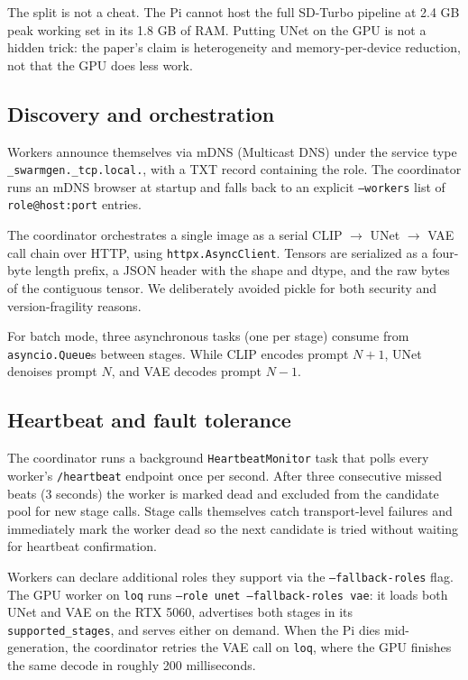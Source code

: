 \documentclass[conference]{IEEEtran}
\begin{document}
The split is not a cheat. The Pi cannot host the full SD-Turbo pipeline at
2.4 GB peak working set in its 1.8 GB of RAM. Putting UNet on the GPU is not
a hidden trick: the paper's claim is heterogeneity and memory-per-device
reduction, not that the GPU does less work.

\subsection{Discovery and orchestration}

Workers announce themselves via mDNS (Multicast DNS) under the service type
\texttt{\_swarmgen.\_tcp.local.}, with a TXT record containing the role.
The coordinator runs an mDNS browser at startup and falls back to an
explicit \texttt{--workers} list of \texttt{role@host:port} entries.

The coordinator orchestrates a single image as a serial CLIP $\rightarrow$
UNet $\rightarrow$ VAE call chain over HTTP, using \texttt{httpx.AsyncClient}.
Tensors are serialized as a four-byte length prefix, a JSON header with the
shape and dtype, and the raw bytes of the contiguous tensor. We deliberately
avoided pickle for both security and version-fragility reasons.

For batch mode, three asynchronous tasks (one per stage) consume from
\texttt{asyncio.Queue}s between stages. While CLIP encodes prompt $N+1$,
UNet denoises prompt $N$, and VAE decodes prompt $N-1$.

\subsection{Heartbeat and fault tolerance}

The coordinator runs a background \texttt{HeartbeatMonitor} task that polls
every worker's \texttt{/heartbeat} endpoint once per second. After three
consecutive missed beats (3 seconds) the worker is marked dead and excluded
from the candidate pool for new stage calls. Stage calls themselves catch
transport-level failures and immediately mark the worker dead so the next
candidate is tried without waiting for heartbeat confirmation.

Workers can declare additional roles they support via the
\texttt{--fallback-roles} flag. The GPU worker on \texttt{loq} runs
\texttt{--role unet --fallback-roles vae}: it loads both UNet and VAE on the
RTX 5060, advertises both stages in its \texttt{supported\_stages}, and
serves either on demand. When the Pi dies mid-generation, the coordinator
retries the VAE call on \texttt{loq}, where the GPU finishes the same decode
in roughly 200 milliseconds.
\end{document}
